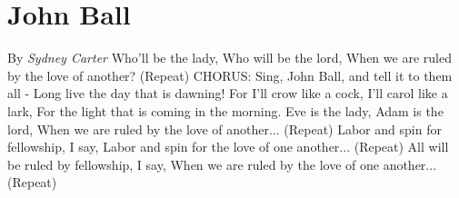 \documentclass{book}%
\begin{document}
\chapter{John Ball}%
By %
\textit{Sydney Carter}%
\newline%
Who’ll be the lady,\newline%
Who will be the lord,\newline%
When we are ruled by the love of another?\newline%
(Repeat)\newline%
\newline%
CHORUS:\newline%
Sing, John Ball, and tell it to them all {-}\newline%
Long live the day that is dawning!\newline%
For I'll crow like a cock,\newline%
I'll carol like a lark,\newline%
For the light that is coming in the morning.\newline%
\newline%
Eve is the lady, Adam is the lord,\newline%
When we are ruled by the love of another...\newline%
(Repeat)\newline%
\newline%
Labor and spin for fellowship, I say,\newline%
Labor and spin for the love of one another...\newline%
(Repeat)\newline%
\newline%
All will be ruled by fellowship, I say,\newline%
When we are ruled by the love of one another...\newline%
(Repeat)\newline%
\newline%
%
\end{document}
